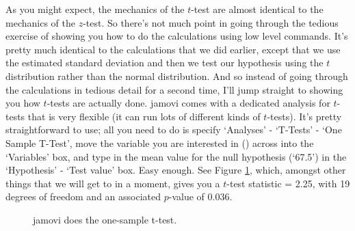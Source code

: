 
As you might expect, the mechanics of the $t$-test are almost identical to the mechanics of the $z$-test. So there's not much point in going through the tedious exercise of showing you how to do the calculations using low level commands. It's pretty much identical to the calculations that we did earlier, except that we use the estimated standard deviation and then we test our hypothesis using the $t$ distribution rather than the normal distribution. And so instead of going through the calculations in tedious detail for a second time, I'll jump straight to showing you how $t$-tests are actually done. jamovi comes with a dedicated analysis for $t$-tests that is very flexible (it can run lots of different kinds of $t$-tests). It's pretty straightforward to use; all you need to do is specify `Analyses' - `T-Tests' - `One Sample T-Test', move the variable you are interested in () across into the `Variables' box, and type in the mean value for the null hypothesis (`67.5') in the `Hypothesis' - `Test value' box. Easy enough. See Figure \ref{fig:ttest_one}, which, amongst other things that we will get to in a moment, gives you a $t$-test statistic = 2.25, with 19 degrees of freedom and an associated $p$-value of 0.036. 

\vspace{0.5cm}
\begin{figure}[ht]
\begin{center}
\caption{jamovi does the one-sample t-test.}
\HR
\label{fig:ttest_one}
\end{center}
\end{figure}

